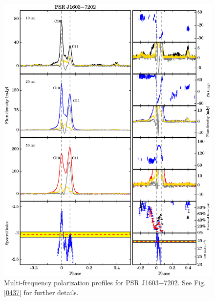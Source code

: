 \documentclass[useAMS,usenatbib]{mn2e}
\begin{document}
\begin{appendix}
\begin{figure}
\begin{center}
\includegraphics[width=6 in]{1603.ps}
\caption{Multi-frequency polarization profiles for PSR J1603$-$7202. 
See Fig. \ref{0437} for further details.}
\label{1603}
\end{center}
\end{figure}


\end{appendix}
\end{document}
